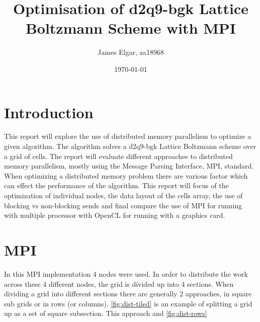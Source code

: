 \documentclass{article}
\title{Optimisation of d2q9-bgk Lattice Boltzmann Scheme with MPI}
\author{James Elgar, za18968}
\date{\today}
\begin{document}
\begin{multicols}{2}

\maketitle

\section{Introduction}

This report will explore the use of distributed memory parallelism to optimize
a given algorithm. The algorithm solves a d2q9-bgk Lattice Boltzmann scheme
over a grid of cells. The report will evaluate different approaches to
distributed memory parallelism, mostly using the Message Parsing Interface,
MPI, standard. When optimizing a distributed memory problem there are various
factor which can effect the performance of the algorithm. This report will
focus of the optimization of individual nodes, the data layout of the cells
array, the use of blocking vs non-blocking sends and final compare the use of
MPI for running with multiple processor with OpenCL for running with a graphics
card.

\section{MPI}

In this MPI implementation 4 nodes were used. In order to distribute the work
across these 4 different nodes, the grid is divided up into 4 sections. When
dividing a grid into different sections there are generally 2 approaches, in
square sub grids or in rows (or columns). \autoref{fig:dist-tiled} is an example of splitting a grid up as a set of square subsection. This approach 
and \autoref{fig:dist-rows}

\begin{center}
\begin{multicols}{2}

\label{fig:dist-tiled}


\end{multicols}
\end{center}
\end{multicols}
\end{document}
